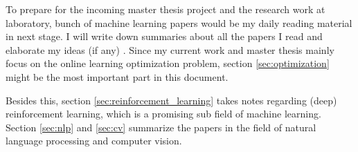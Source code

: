 To prepare for the incoming master thesis project and the research work at laboratory, bunch of machine learning papers would be my daily reading material in next stage. I will write down summaries about all the papers I read and elaborate my ideas (if any) . Since my current work and master thesis mainly focus on the online learning optimization problem, section \ref{sec:optimization} might be the most important part in this document. 

Besides this, section \ref{sec:reinforcement_learning} takes notes regarding (deep) reinforcement learning, which is a promising sub field of machine learning. Section \ref{sec:nlp} and \ref{sec:cv} summarize the papers in the field of natural language processing and computer vision. 

